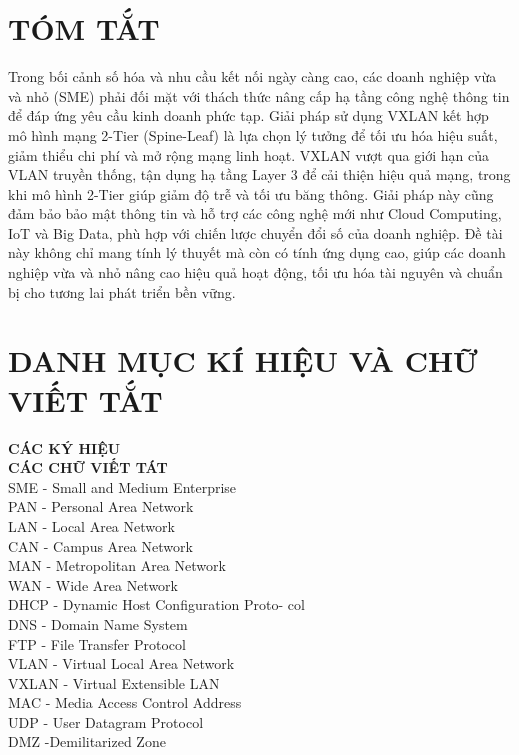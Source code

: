 \documentclass[13pt]{article}
\begin{document}
\newpage

\section*{TÓM TẮT}
Trong bối cảnh số hóa và nhu cầu kết nối ngày càng cao, các doanh nghiệp vừa và nhỏ (SME) phải đối mặt với thách thức nâng cấp hạ tầng công nghệ thông tin để đáp ứng yêu cầu kinh doanh phức tạp. Giải pháp sử dụng VXLAN kết hợp mô hình mạng 2-Tier (Spine-Leaf) là lựa chọn lý tưởng để tối ưu hóa hiệu suất, giảm thiểu chi phí và mở rộng mạng linh hoạt. VXLAN vượt qua giới hạn của VLAN truyền thống, tận dụng hạ tầng Layer 3 để cải thiện hiệu quả mạng, trong khi mô hình 2-Tier giúp giảm độ trễ và tối ưu băng thông. Giải pháp này cũng đảm bảo bảo mật thông tin và hỗ trợ các công nghệ mới như Cloud Computing, IoT và Big Data, phù hợp với chiến lược chuyển đổi số của doanh nghiệp. Đề tài này không chỉ mang tính lý thuyết mà còn có tính ứng dụng cao, giúp các doanh nghiệp vừa và nhỏ nâng cao hiệu quả hoạt động, tối ưu hóa tài nguyên và chuẩn bị cho tương lai phát triển bền vững.

\newpage
{} %
\tableofcontents
\newpage

\section*{DANH MỤC KÍ HIỆU VÀ CHỮ VIẾT TẮT}

\textbf{CÁC KÝ HIỆU}\\

\textbf{CÁC CHỮ VIẾT TÁT}\\
SME - Small and Medium Enterprise\\
PAN - Personal Area Network\\
LAN - Local Area Network\\
CAN - Campus Area Network\\
MAN - Metropolitan Area Network\\
WAN - Wide Area Network\\
DHCP - Dynamic Host Configuration Proto-
col\\
DNS - Domain Name System\\
FTP - File Transfer Protocol\\
VLAN - Virtual Local Area Network\\
VXLAN - Virtual Extensible LAN\\
MAC - Media Access Control Address\\
UDP - User Datagram Protocol\\
DMZ -Demilitarized Zone
\newpage
\end{document}
